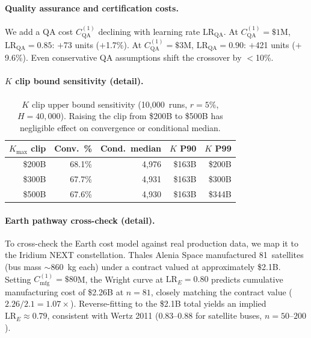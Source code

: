 \documentclass[preprint,12pt]{elsarticle}
\begin{document}
\paragraph{Quality assurance and certification costs.} We add a QA cost $C_{\mathrm{QA}}^{(1)}$ declining with learning rate $\mathrm{LR}_{\mathrm{QA}}$. At $C_{\mathrm{QA}}^{(1)} = \$1$M, $\mathrm{LR}_{\mathrm{QA}} = 0.85$: $+$73 units ($+$1.7\%). At $C_{\mathrm{QA}}^{(1)} = \$3$M, $\mathrm{LR}_{\mathrm{QA}} = 0.90$: $+$421 units ($+$9.6\%). Even conservative QA assumptions shift the crossover by $<$10\%.

\paragraph{$K$ clip bound sensitivity (detail).}

\begin{table}[htbp]
\centering
\caption{$K$ clip upper bound sensitivity (10{,}000~runs, $r = 5\%$, $H = 40{,}000$). Raising the clip from \$200B to \$500B has negligible effect on convergence or conditional median.}
\label{tab:k_clip}
\small
\begin{tabular}{@{}rrrrr@{}}
\toprule
$K_{\max}$ clip & Conv.\ \% & Cond.\ median & $K$ P90 & $K$ P99 \\
\midrule
\$200B & 68.1\% & 4{,}976 & \$163B & \$200B \\
\$300B & 67.7\% & 4{,}931 & \$163B & \$300B \\
\$500B & 67.6\% & 4{,}930 & \$163B & \$344B \\
\bottomrule
\end{tabular}
\end{table}

\paragraph{Earth pathway cross-check (detail).} To cross-check the Earth cost model against real production data, we map it to the Iridium NEXT constellation. Thales Alenia Space manufactured 81~satellites (bus mass $\sim$860~kg each) under a contract valued at approximately \$2.1B. Setting $C_{\mathrm{mfg}}^{(1)} = \$80$M, the Wright curve at $\mathrm{LR}_E = 0.80$ predicts cumulative manufacturing cost of \$2.26B at $n = 81$, closely matching the contract value ($2.26/2.1 = 1.07\times$). Reverse-fitting to the \$2.1B total yields an implied $\mathrm{LR}_E \approx 0.79$, consistent with Wertz 2011 \cite{wertz2011} (0.83--0.88 for satellite buses, $n = 50$--$200$).
\end{document}

